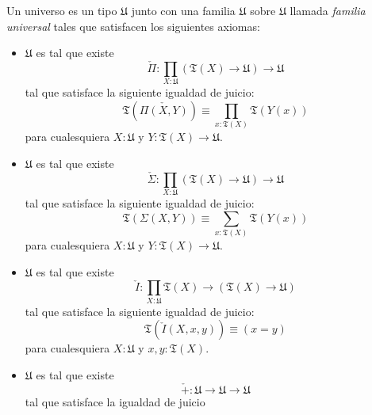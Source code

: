 \documentclass{article}
\begin{document}
        \begin{definition}[Universo]
            Un universo es un tipo $\mathfrak{U}$ junto con una familia
            $\mathfrak{U}$ sobre $\mathfrak{U}$ llamada 
            \textit{familia universal} tales que satisfacen los siguientes
            axiomas:

            \begin{itemize}
                \item $\mathfrak{U}$ es tal que existe 
                $$
                \check{\Pi} : \prod\limits_{X : \mathfrak{U}} 
                    (\mathfrak{T}(X) \rightarrow \mathfrak{U}) 
                        \rightarrow \mathfrak{U}
                $$
                tal que satisface la siguiente igualdad de juicio:
                $$
                    \mathfrak{T}(\check{\Pi(X,Y)}) \equiv 
                        \prod\limits_{x : \mathfrak{T}(X)} \mathfrak{T}(Y(x))
                $$
                para cualesquiera $X : \mathfrak{U}$ y 
                    $Y : \mathfrak{T}(X) \rightarrow \mathfrak{U}$.
                \item $\mathfrak{U}$ es tal que existe
                $$
                \check{\Sigma} : \prod\limits_{X : \mathfrak{U}} 
                    (\mathfrak{T}(X) \rightarrow \mathfrak{U}) 
                        \rightarrow \mathfrak{U}
                $$
                tal que satisface la siguiente igualdad de juicio:
                $$
                    \mathfrak{T}(\Sigma(X,Y)) \equiv 
                        \sum\limits_{x : \mathfrak{T}(X)}\mathfrak{T}(Y(x))
                $$
                para cualesquiera $X : \mathfrak{U}$ y 
                $Y : \mathfrak{T}(X) \rightarrow \mathfrak{U}$.
                \item $\mathfrak{U}$ es tal que existe
                $$
                    \check{I} : \prod\limits_{X : \mathfrak{U}} \mathfrak{T}(X)  
                        \rightarrow (\mathfrak{T}(X) \rightarrow \mathfrak{U})
                $$
                tal que satisface la siguiente igualdad de juicio:
                $$
                    \mathfrak{T}(\check{I}(X, x, y)) \equiv (x = y)
                $$
                para cualesquiera $X : \mathfrak{U}$ y $x,y : \mathfrak{T}(X)$.
                \item $\mathfrak{U}$ es tal que existe 
                $$
                    \check{+}:\mathfrak{U} \rightarrow \mathfrak{U} 
                        \rightarrow \mathfrak{U}
                $$
                tal que satisface la igualdad de juicio

\end{itemize}
\end{definition}
\end{document}
